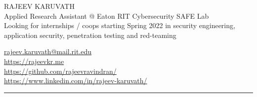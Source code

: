 \documentclass[letterpaper]{deedy-resume} %
\begin{document}

\begin{minipage}[t]{0.50\textwidth}

\begin{flushleft}
\Huge{}\uppercase{Rajeev Karuvath} \\
\sectionspace
\small{Applied Research Assistant @ Eaton RIT Cybersecurity SAFE Lab} \\
\sectionspace
{}\scriptsize{Looking for internships / coops starting Spring 2022 in security engineering, application security, penetration testing and red-teaming}
\end{flushleft}

\end{minipage}
\begin{minipage}[t]{0.40\textwidth}
\begin{flushright}
\small
\href{mailto:rk3824@rit.edu}{rajeev.karuvath@mail.rit.edu}  \faEnvelope \\
\url{https://rajeevkr.me}  \faChrome \\
\url{https://github.com/rajeevravindran/}  \faGithub  \\
\url{https://www.linkedin.com/in/rajeev-karuvath/}  \faLinkedin  \\

\end{flushright}
\end{minipage}
\sectionspace
\begin{hline}
\noindent\rule{\textwidth}{1pt}
\end{hline}

\end{document}
